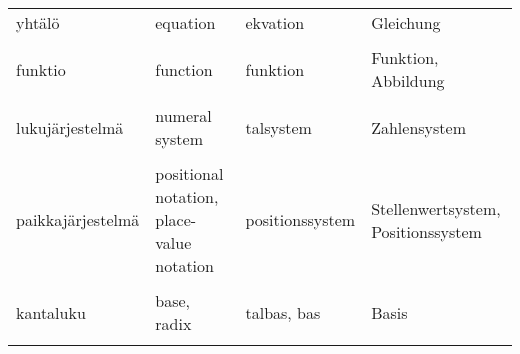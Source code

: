 \begin{tabular}{| l | l | l | l |}
		yhtälö & equation & ekvation & Gleichung \\ \\
		funktio & function & funktion & Funktion, Abbildung \\ \\
		lukujärjestelmä & numeral system & talsystem & Zahlensystem \\ \\
		paikkajärjestelmä & positional notation, place-value notation & positionssystem & Stellenwertsystem, Positionssystem \\ \\
		kantaluku & base, radix & talbas, bas & Basis \\ \\
\end{tabular}
